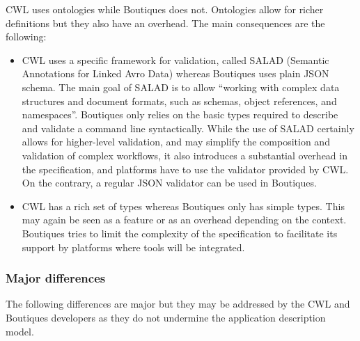 \documentclass[a4paper,num-refs]{oup-contemporary}
\newcommand{\boutiques}{Boutiques\xspace}
\begin{document}
CWL uses ontologies while \boutiques does not. Ontologies allow for
richer definitions but they also have an overhead. The main
consequences are the following:
\begin{itemize}
\item CWL uses a specific framework for
validation, called SALAD (Semantic Annotations for Linked Avro Data)
whereas \boutiques uses plain JSON schema. The main goal of SALAD is to
allow ``working with complex data structures and document formats, such
as schemas, object references, and namespaces''. \boutiques only relies
on the basic types required to describe and validate a command line
syntactically. While the use of SALAD certainly allows for
higher-level validation, and may simplify the composition and
validation of complex workflows, it also introduces a substantial
overhead in the specification, and platforms have to use the validator
provided by CWL. On the contrary, a regular JSON validator can be used in \boutiques.
\item  CWL has a rich set of types whereas \boutiques only has simple
types. This may again be seen as a feature or as an overhead
depending on the context. \boutiques tries to limit the complexity of
the specification to facilitate its support by platforms where tools
will be integrated.
\end{itemize}

\subsubsection{Major differences}

The following differences are major but they may be addressed by the
CWL and \boutiques developers as they do not undermine the application
description model.
\end{document}
